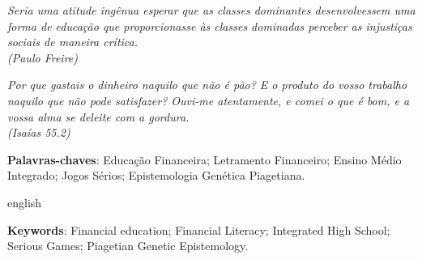 \newpage
\begin{epigrafe}
    \vspace*{\fill}
	\begin{flushright}
		\textit{Seria uma atitude ingênua esperar que as classes dominantes desenvolvessem uma forma de educação que proporcionasse às classes dominadas perceber as injustiças sociais de maneira crítica.\\
        (Paulo Freire)}
    \end{flushright}
    \begin{flushright}
        \textit{Por que gastais o dinheiro naquilo que não é pão? E o produto do vosso trabalho naquilo que não pode satisfazer? Ouvi-me atentamente, e comei o que é bom, e a vossa alma se deleite com a gordura.\\
        (Isaías 55.2)}
	\end{flushright}
\end{epigrafe}


\setlength{\absparsep}{18pt} %
\begin{resumo}
	
	
 	\noindent 
	\textbf{Palavras-chaves}: Educação Financeira; Letramento Financeiro; Ensino Médio Integrado; Jogos Sérios; Epistemologia Genética Piagetiana.
\end{resumo}

\begin{resumo}[Abstract]
\begin{otherlanguage*}{english}

    
 
	\noindent 
	\textbf{Keywords}: Financial education; Financial Literacy; Integrated High School; Serious Games; Piagetian Genetic Epistemology.
\end{otherlanguage*}
\end{resumo}

